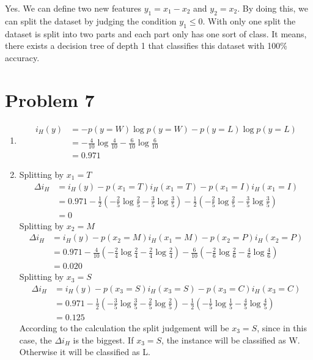 \documentclass[12pt]{scrartcl}
\begin{document}
  Yes. We can define two new features $y_1 = x_1 - x_2$ and $y_2 = x_2$. By doing 
  this, we can split the dataset by judging the condition $y_1 \leqslant 0$. With
  only one split the dataset is split into two parts and each part only has one sort
  of class. It means, there exists a decision tree of depth 1 that classifies this 
  dataset with 100\% accuracy.

  
  \section*{Problem 7}
    \begin{enumerate}[label=\alph*)]
      \item 
      \begin{equation*}
        \begin{split}
          i_H(y) &= -p(y=W)\log{p(y=W)} - p(y=L)\log{p(y=L)}  \\
          &= -\frac{4}{10}\log{\frac{4}{10}} - \frac{6}{10}\log{\frac{6}{10}} \\
          &= 0.971
        \end{split} 
      \end{equation*}
      \item 
      Splitting by \(x_1 = T\) \\
      \[
        \begin{split}
          \Delta i_H &= i_H(y) - p(x_1 = T)i_H(x_1=T) - p(x_1=I)i_H(x_1=I) \\
          &= 0.971 - \frac1 2( -\frac2 5\log{\frac2 5} - \frac3 5\log{\frac3 5} ) 
          -\frac1 2( -\frac2 5\log{\frac2 5} - \frac3 5\log{\frac3 5} ) \\
          &= 0
        \end{split}
      \]
      Splitting by \(x_2 = M\) \\
      \[
        \begin{split}
          \Delta i_H &= i_H(y) - p(x_2 = M)i_H(x_1=M) - p(x_2=P)i_H(x_2=P) \\
          &= 0.971 - \frac4 {10}( -\frac2 4\log{\frac2 4} - \frac2 4\log{\frac2 4} ) 
          -\frac6 {10}( -\frac2 6\log{\frac2 6} - \frac4 6\log{\frac4 6} ) \\
          &= 0.020
        \end{split}
      \]
      Splitting by \(x_3 = S\) \\
      \[
        \begin{split}
          \Delta i_H &= i_H(y) - p(x_3 = S)i_H(x_3=S) - p(x_3=C)i_H(x_3=C) \\
          &= 0.971 - \frac1 2( -\frac3 5\log{\frac3 5} - \frac2 5\log{\frac2 5} ) 
          -\frac1 2( -\frac1 5\log{\frac1 5} - \frac4 5\log{\frac4 5} ) \\
          &= 0.125
        \end{split}
      \]
      According to the calculation the split judgement will be \(x_3 = S\), since
      in this case, the \(\Delta i_H\) is the biggest. If \(x_3 = S\), the instance
      will be classified as W. Otherwise it will be classified as L.
    \end{enumerate}
\clearpage    
\end{document}
